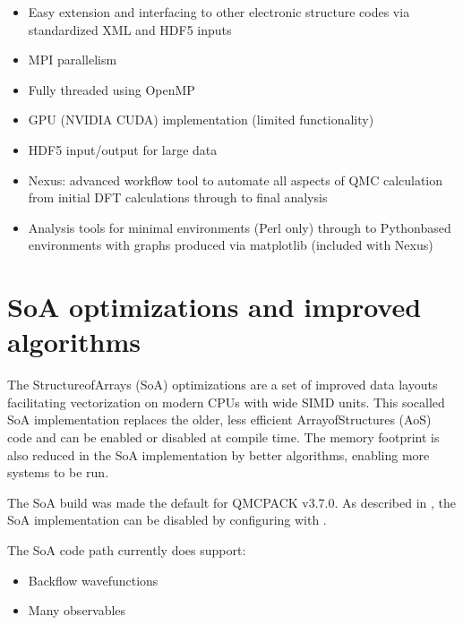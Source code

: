 \documentclass[letterpaper,10pt,english]{sphinxmanual}
\begin{document}
\begin{itemize}
\item {} 
Easy extension and interfacing to other electronic structure codes
via standardized XML and HDF5 inputs

\item {} 
MPI parallelism

\item {} 
Fully threaded using OpenMP

\item {} 
GPU (NVIDIA CUDA) implementation (limited functionality)

\item {} 
HDF5 input/output for large data

\item {} 
Nexus: advanced workflow tool to automate all aspects of QMC
calculation from initial DFT calculations through to final analysis

\item {} 
Analysis tools for minimal environments (Perl only) through to
Python\sphinxhyphen{}based environments with graphs produced via matplotlib
(included with Nexus)

\end{itemize}


\section{SoA optimizations and improved algorithms}
\label{\detokenize{features:soa-optimizations-and-improved-algorithms}}
The Structure\sphinxhyphen{}of\sphinxhyphen{}Arrays (SoA) optimizations
 are a set of improved data layouts
facilitating vectorization on modern CPUs with wide SIMD units.  This so\sphinxhyphen{}called SoA implementation
replaces the older, less efficient Array\sphinxhyphen{}of\sphinxhyphen{}Structures (AoS) code and
can be enabled or disabled at compile time. The memory footprint is also
reduced in the SoA implementation by better algorithms, enabling more
systems to be run.

The SoA build was made the default for QMCPACK v3.7.0. As described in {\hyperref[\detokenize{installation:cmakeoptions}]{}}, the SoA
implementation can be disabled by configuring with .

The SoA code path currently does  support:
\begin{itemize}
\item {} 
Backflow wavefunctions

\item {} 
Many observables

\end{itemize}
\end{document}
